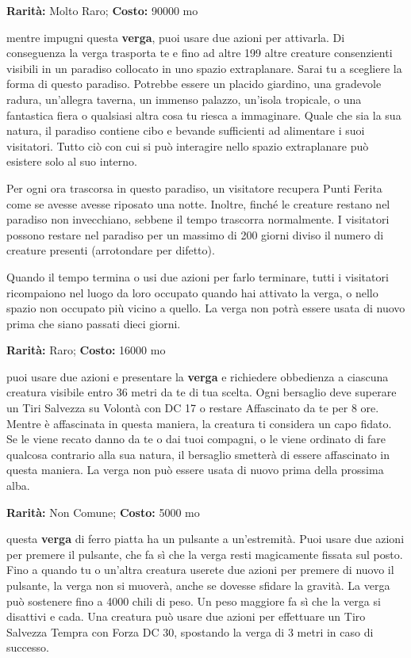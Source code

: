 \begin{multicols}{2}

\textbf{Rarità:} Molto Raro; \textbf{Costo:} 90000 mo

mentre impugni questa \textbf{verga}, puoi usare due azioni per attivarla. Di conseguenza la verga trasporta te e fino ad altre 199 altre creature consenzienti visibili in un paradiso collocato in uno spazio extraplanare. Sarai tu a scegliere la forma di questo paradiso. Potrebbe essere un placido giardino, una gradevole radura, un'allegra taverna, un immenso palazzo, un'isola tropicale, o una fantastica fiera o qualsiasi altra cosa tu riesca a immaginare. Quale che sia la sua natura, il paradiso contiene cibo e bevande sufficienti ad alimentare i suoi visitatori. Tutto ciò con cui si può interagire nello spazio extraplanare può esistere solo al suo interno.

Per ogni ora trascorsa in questo paradiso, un visitatore recupera Punti Ferita come se avesse avesse riposato una notte. Inoltre, finché le creature restano nel paradiso non invecchiano, sebbene il tempo trascorra normalmente. I visitatori possono restare nel paradiso per un massimo di 200 giorni diviso il numero di creature presenti (arrotondare per difetto).

Quando il tempo termina o usi due azioni per farlo terminare, tutti i visitatori ricompaiono nel luogo da loro occupato quando hai attivato la verga, o nello spazio non occupato più vicino a quello. La verga non potrà essere usata di nuovo prima che siano passati dieci giorni.


\textbf{Rarità:} Raro; \textbf{Costo:} 16000 mo

puoi usare due azioni e presentare la \textbf{verga} e richiedere obbedienza a ciascuna creatura visibile entro 36 metri da te di tua scelta. Ogni bersaglio deve superare un Tiri Salvezza su Volontà con DC 17 o restare Affascinato da te per 8 ore. Mentre è affascinata in questa maniera, la creatura ti considera un capo fidato. Se le viene recato danno da te o dai tuoi compagni, o le viene ordinato di fare qualcosa contrario alla sua natura, il bersaglio smetterà di essere affascinato in questa maniera. La verga non può essere usata di nuovo prima della prossima alba.


\textbf{Rarità:} Non Comune; \textbf{Costo:} 5000 mo

questa \textbf{verga} di ferro piatta ha un pulsante a un'estremità. Puoi usare due azioni per premere il pulsante, che fa sì che la verga resti magicamente fissata sul posto. Fino a quando tu o un'altra creatura userete due azioni per premere di nuovo il pulsante, la verga non si muoverà, anche se dovesse sfidare la gravità. La verga può sostenere fino a 4000 chili di peso. Un peso maggiore fa sì che la verga si disattivi e cada. Una creatura può usare due azioni per effettuare un Tiro Salvezza Tempra con Forza DC 30, spostando la verga di 3 metri in caso di successo.


\end{multicols}
